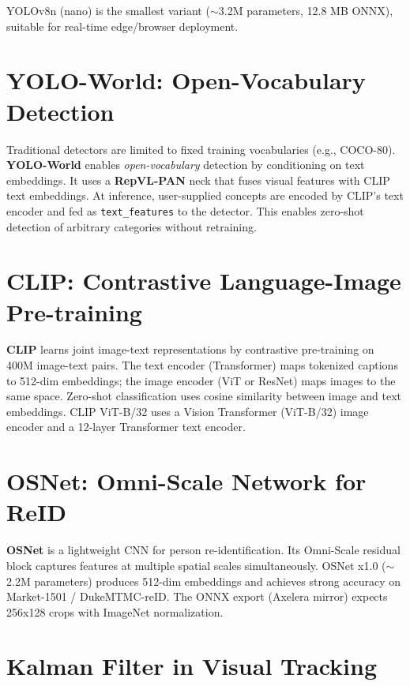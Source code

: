YOLOv8n (nano) is the smallest variant ($\sim$3.2M parameters, 12.8 MB ONNX), suitable for real-time edge/browser deployment.

\section{YOLO-World: Open-Vocabulary Detection}
\label{sec:yoloworld}

Traditional detectors are limited to fixed training vocabularies (e.g., COCO-80). \textbf{YOLO-World} \cite{cheng2024yoloworld} enables \textit{open-vocabulary} detection by conditioning on text embeddings. It uses a \textbf{RepVL-PAN} neck that fuses visual features with CLIP \cite{radford2021clip} text embeddings. At inference, user-supplied concepts are encoded by CLIP's text encoder and fed as \texttt{text\_features} to the detector. This enables zero-shot detection of arbitrary categories without retraining.

\section{CLIP: Contrastive Language-Image Pre-training}
\label{sec:clip}

\textbf{CLIP} \cite{radford2021clip} learns joint image-text representations by contrastive pre-training on 400M image-text pairs. The text encoder (Transformer) maps tokenized captions to 512-dim embeddings; the image encoder (ViT or ResNet) maps images to the same space. Zero-shot classification uses cosine similarity between image and text embeddings. CLIP ViT-B/32 uses a Vision Transformer (ViT-B/32) image encoder and a 12-layer Transformer text encoder.

\section{OSNet: Omni-Scale Network for ReID}
\label{sec:osnet}

\textbf{OSNet} \cite{zhou2019osnet} is a lightweight CNN for person re-identification. Its Omni-Scale residual block captures features at multiple spatial scales simultaneously. OSNet x1.0 ($\sim$2.2M parameters) produces 512-dim embeddings and achieves strong accuracy on Market-1501 / DukeMTMC-reID. The ONNX export (Axelera mirror) expects 256x128 crops with ImageNet normalization.

\section{Kalman Filter in Visual Tracking}
\label{sec:kf-tracking}

